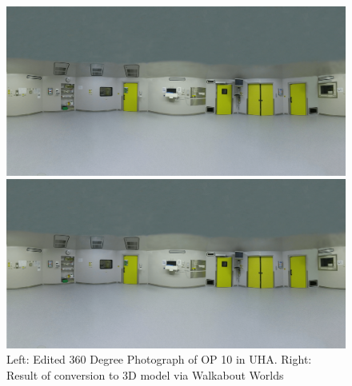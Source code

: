 \begin{figure}[ht]
    \centering
    \begin{minipage}{.5\textwidth}
      \centering
      \includegraphics[width=0.95\linewidth]{images/implementation/operating_room_360.png}
    \end{minipage}%
    \begin{minipage}{.5\textwidth}
      \centering
      \includegraphics[width=0.95\linewidth]{images/implementation/operating_room_360.png}
    \end{minipage}
    \caption{\label{fig::360OperatingRoom}Left: Edited 360 Degree Photograph of OP 10 in UHA. Right: Result of conversion to 3D model via Walkabout Worlds}
\end{figure}